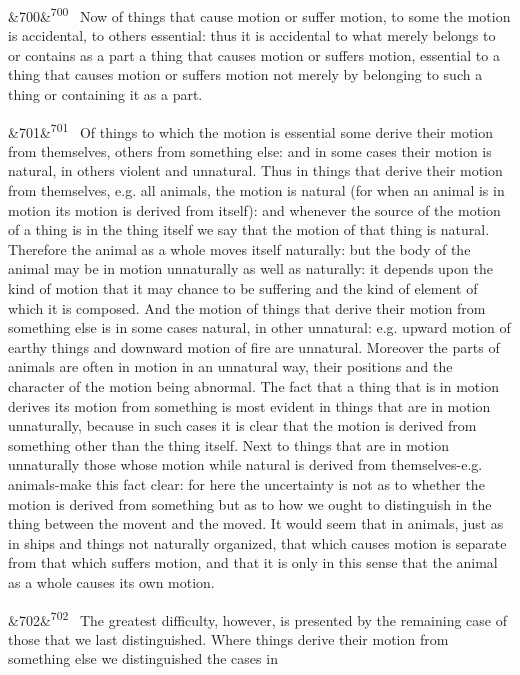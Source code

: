 \documentclass[12pt]{article}
\newcommand{\para}[1][]{\par\noindent\ifx&#1&\else\textsuperscript{\footnotesize #1}~\fi}
\begin{document}
\para[700] Now of things that cause motion or suffer motion, to some the motion is accidental, to others essential: thus it is accidental to what merely belongs to or contains as a part a thing that causes motion or suffers motion, essential to a thing that causes motion or suffers motion not merely by belonging to such a thing or containing it as a part.

\para[701] Of things to which the motion is essential some derive their motion from themselves, others from something else: and in some cases their motion is natural, in others violent and unnatural. Thus in things that derive their motion from themselves, e.g. all animals, the motion is natural (for when an animal is in motion its motion is derived from itself): and whenever the source of the motion of a thing is in the thing itself we say that the motion of that thing is natural. Therefore the animal as a whole moves itself naturally: but the body of the animal may be in motion unnaturally as well as naturally: it depends upon the kind of motion that it may chance to be suffering and the kind of element of which it is composed. And the motion of things that derive their motion from something else is in some cases natural, in other unnatural: e.g. upward motion of earthy things and downward motion of fire are unnatural. Moreover the parts of animals are often in motion in an unnatural way, their positions and the character of the motion being abnormal. The fact that a thing that is in motion derives its motion from something is most evident in things that are in motion unnaturally, because in such cases it is clear that the motion is derived from something other than the thing itself. Next to things that are in motion unnaturally those whose motion while natural is derived from themselves-e.g. animals-make this fact clear: for here the uncertainty is not as to whether the motion is derived from something but as to how we ought to distinguish in the thing between the movent and the moved. It would seem that in animals, just as in ships and things not naturally organized, that which causes motion is separate from that which suffers motion, and that it is only in this sense that the animal as a whole causes its own motion.

\para[702] The greatest difficulty, however, is presented by the remaining case of those that we last distinguished. Where things derive their motion from something else we distinguished the cases in
\end{document}
